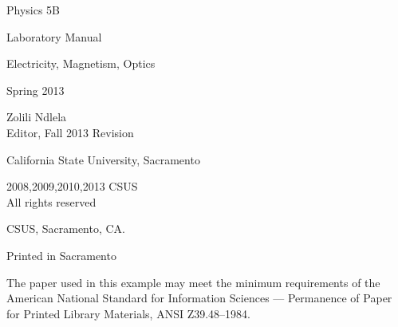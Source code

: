 
\newpage
\vspace*	{2in}
\begin{center}
	\HUGE\textsf{Physics 5B}\par
\end{center}
\begin{center}
	\LARGE\textsf{Laboratory Manual}\par
\end{center}
\begin{center}
	\HUGE\textsf{Electricity, Magnetism, Optics}\par
\end{center}
\begin{center}
	\Huge\textsf{Spring 2013}\par
\end{center}
\vfill
\begin{center}
	\LARGE\textsf{Zolili Ndlela\\Editor, Fall 2013 Revision}\par
\LARGE\textsf{California State University, Sacramento}\par
\end{center}
 
\vspace*{\fill}
\def\ZUN{Z\kern-0.2em U\kern-0.4em N}%
\def\ZUN{Z\kern-0.15em U\kern-0.3em N}%
\clearpage

\begingroup
\footnotesize
\setlength{\parindent}{0pt}
\setlength{\parskip}{\baselineskip}
\textcopyright{} 2008,2009,2010,2013 CSUS \\
All rights reserved

CSUS, Sacramento, CA.

Printed in Sacramento 

The paper used in this example may meet the minimum requirements
of the American National Standard for Information 
Sciences --- Permanence of Paper for Printed Library Materials, 
ANSI Z39.48--1984.


